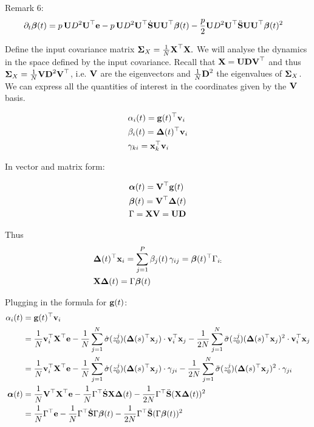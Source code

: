 \documentclass{article} %
\begin{document}
Remark 6: 
\begin{align}
    \partial_t \vbeta(t) 
    &= p\,\vU D^2\vU^\top\ve - p\,\vU D^2\vU^\top \dot\vS\vU  \vU^\top\vbeta(t) - \frac{p}{2} \vU D^2\vU^\top\ddot\vS \vU \vU^\top\vbeta(t)^2 
\end{align}

Define the input covariance matrix $\vSigma_X = \frac{1}{N} \vX^\top \vX.$ We will analyse the dynamics in the space defined by the input covariance. Recall that $\vX = \vU \vD \vV^\top $ and thus $\vSigma_X = \frac{1}{N}\vV \vD^2 \vV^\top $, i.e. $\vV$ are the eigenvectors and $\frac{1}{N}\vD^2$ the eigenvalues of $\vSigma_X$. We can express all the quantities of interest in the coordinates given by the $\vV$ basis. 

\begin{align}
    &\alpha_i(t) = \vg(t)^\top \vv_i \\
    &\beta_i(t) = \vDelta(t)^\top \vv_i\\
    &\gamma_{ki} = \vx_k^\top \vv_i 
\end{align}



In vector and matrix form:  

\begin{align}
    &\valpha(t) = \vV^\top\vg(t) \\
    &\vbeta(t) = \vV^\top\vDelta(t)\\
    &\Gamma = \vX\vV = \vU \vD
\end{align}



Thus 
\begin{align}
    &\vDelta(t)^\top \vx_i = \sum_{j=1}^P \beta_j(t)\,\gamma_{ij} = \vbeta(t)^\top\Gamma_{i:} \\
    &\vX \vDelta(t) = \Gamma \vbeta(t)
\end{align}

Plugging in the formula for $\vg(t)$: 
\begin{align}
    \alpha_i(t) 
    &= \vg(t)^\top \vv_i\\
    &= \frac{1}{N} \vv_i^\top\vX^\top\ve - \frac{1}{N} \sum_{j=1}^N \dot\sigma(z_0^j) (\vDelta(s)^\top \vx_j) \cdot \vv_i^\top\vx_j - \frac{1}{2N} \sum_{j=1}^N \ddot\sigma(z_0^j)  (\vDelta(s)^\top \vx_j)^2 \cdot \vv_i^\top\vx_j \nonumber\\
    &= \frac{1}{N} \vv_i^\top\vX^\top\ve - \frac{1}{N} \sum_{j=1}^N \dot\sigma(z_0^j) (\vDelta(s)^\top \vx_j) \cdot \gamma_{ji} - \frac{1}{2N} \sum_{j=1}^N \ddot\sigma(z_0^j)  (\vDelta(s)^\top \vx_j)^2 \cdot \gamma_{ji} \nonumber\\
    \valpha(t) 
    &= \frac{1}{N} \vV^\top\vX^\top\ve - \frac{1}{N} \Gamma^\top\dot\vS\vX\vDelta(t)
    - \frac{1}{2N} \Gamma^\top \ddot\vS (\vX\vDelta(t))^2 \nonumber\\
    &= \frac{1}{N} \Gamma^\top\ve - \frac{1}{N} \Gamma^\top\dot\vS\Gamma \vbeta(t)
    - \frac{1}{2N} \Gamma^\top \ddot\vS (\Gamma \vbeta(t))^2 \nonumber\\
\end{align}
\end{document}
